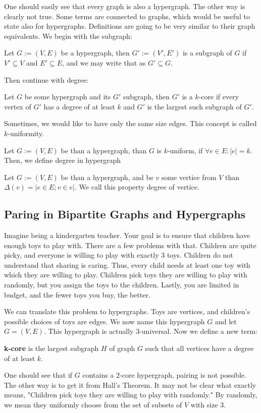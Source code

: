 One should easily see that every graph is also a hypergraph. The other way is clearly not true. Some terms are connected to graphs, which would be useful to state also for hypergraphs. Definitions are going to be very similar to their graph equivalents. We begin with the subgraph:

\begin{defn}
    Let \(G:= (V, E)\) be a hypergraph, then \(G':= (V',E')\) is a subgraph of \(G\) if \(V'\subseteq V\) and \(E' \subseteq E\), and we may write that as \(G' \subseteq G\).
\end{defn}

Then continue with degree:

\begin{defn}
    Let \(G\) be some hypergraph and its \(G'\) subgraph, then \(G'\) is a \(k\)-core if every vertex of \(G'\) has a degree of at least \(k\) and \(G'\) is the largest such subgraph of \(G'\).
\end{defn}

Sometimes, we would like to have only the same size edges. This concept is called $k$-uniformity.
\begin{defn}
    Let \(G:= (V, E)\) be than a hypergraph, than $G$ is $k$-uniform, if $\forall e \in E : |e| = k$.
    Then, we define degree in hypergraph
\end{defn}

\begin{defn}
    Let \(G:= (V, E)\) be than a hypergraph, and be $v$ some vertice from $V$ than $\Delta(v) = |{e \in E; v\in e }|$. We call this property degree of vertice.
\end{defn}


\subsection{Paring in Bipartite Graphs and Hypergraphs}
Imagine being a kindergarten teacher. Your goal is to ensure that children have enough toys to play with. 
There are a few problems with that. Children are quite picky, and everyone is willing to play with exactly 3 toys.
 Children do not understand that sharing is caring. Thus, every child needs at least one toy with which they are willing to play. Children pick toys they are willing to play with randomly, but you assign the toys to the children. Lastly, you are limited in budget, and the fewer toys you buy, the better.

We can translate this problem to hypergraphs. Toys are vertices, and children's possible choices of toys are edges. We now name this hypergraph $G$ and let $G = (V, E)$. This hypergraph is actually $3$-universal. Now we define a new term:
\begin{defn}
   \textbf{k-core} is the largest subgraph \( H \) of graph \( G \) such that all vertices have a degree of at least \( k \). 
\end{defn}
One should see that if $G$ contains a $2$-core hypergraph, pairing is not possible. The other way is to get it from Hall's Theorem. It may not be clear what exactly means, "Children pick toys they are willing to play with randomly." By randomly, we mean they uniformly choose from the set of subsets of $V$ with size $3$.

